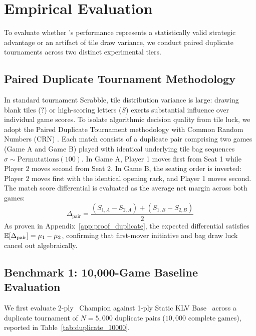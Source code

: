 \section{Empirical Evaluation}
\label{sec:experiments}

To evaluate whether \algo's performance represents a statistically valid strategic advantage or an artifact of tile draw variance, we conduct paired duplicate tournaments across two distinct experimental tiers.

\subsection{Paired Duplicate Tournament Methodology}

In standard tournament Scrabble, tile distribution variance is large: drawing blank tiles ($?$) or high-scoring letters ($S$) exerts substantial influence over individual game scores. To isolate algorithmic decision quality from tile luck, we adopt the Paired Duplicate Tournament methodology with Common Random Numbers (CRN) \citep{olaughlin2006quackle}. Each match consists of a duplicate pair comprising two games (Game A and Game B) played with identical underlying tile bag sequences $\sigma \sim \mathrm{Permutations}(100)$. In Game A, Player 1 moves first from Seat 1 while Player 2 moves second from Seat 2. In Game B, the seating order is inverted: Player 2 moves first with the identical opening rack, and Player 1 moves second. The match score differential is evaluated as the average net margin across both games:
\begin{equation}
    \Delta_{\mathrm{pair}} = \frac{(S_{1, A} - S_{2, A}) + (S_{1, B} - S_{2, B})}{2}
\end{equation}
As proven in Appendix~\ref{app:proof_duplicate}, the expected differential satisfies $\mathbb{E}[\Delta_{\mathrm{pair}}] = \mu_1 - \mu_2$, confirming that first-mover initiative and bag draw luck cancel out algebraically.

\subsection{Benchmark 1: 10,000-Game Baseline Evaluation}

We first evaluate 2-ply \bams\ Champion against 1-ply Static KLV Base \magpie\ across a duplicate tournament of $N = 5,000$ duplicate pairs ($10,000$ complete games), reported in Table~\ref{tab:duplicate_10000}.


